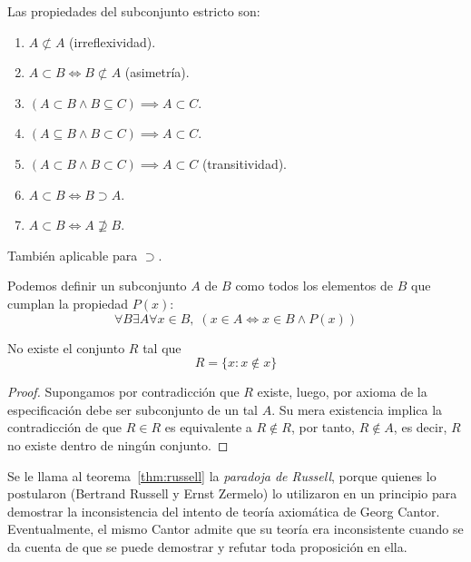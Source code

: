 \documentclass[11pt,oneside,a4paper]{book}
\begin{document}
\begin{prop}
Las propiedades del subconjunto estricto son:
\begin{enumerate}
\item $A\not\subset A$ (irreflexividad).
\item $A\subset B\iff B\not\subset A$ (asimetría).
\item $(A\subset B\wedge B\subseteq C)\implies A\subset C$.
\item $(A\subseteq B\wedge B\subset C)\implies A\subset C$.
\item $(A\subset B\wedge B\subset C)\implies A\subset C$ (transitividad).
\item $A\subset B\iff B\supset A$.
\item $A\subset B\iff A\not\supseteq B$.
\end{enumerate}
También aplicable para $\supset$.
\end{prop}

\begin{axiom}[de Especificación]
Podemos definir un subconjunto $A$ de $B$ como todos los elementos de $B$ que cumplan la propiedad $P(x)$:
$$
\forall B\exists A\forall x\in B,\;(x\in A\iff x\in B\wedge P(x))
$$
\end{axiom}
\begin{thm}\label{thm:russell}
No existe el conjunto $R$ tal que
$$R=\{x:x\notin x\}$$
\end{thm}
\begin{proof}
Supongamos por contradicción que $R$ existe, luego, por axioma de la especificación debe ser subconjunto de un tal $A$. Su mera existencia implica la contradicción de que $R\in R$ es equivalente a $R\notin R$, por tanto, $R\notin A$, es decir, $R$ no existe dentro de ningún conjunto.
\end{proof}
Se le llama al teorema~\ref{thm:russell} la \textit{paradoja de Russell}, porque quienes lo postularon (Bertrand Russell y Ernst Zermelo) lo utilizaron en un principio para demostrar la inconsistencia del intento de teoría axiomática de Georg Cantor. Eventualmente, el mismo Cantor admite que su teoría era inconsistente cuando se da cuenta de que se puede demostrar y refutar toda proposición en ella.
\end{document}
